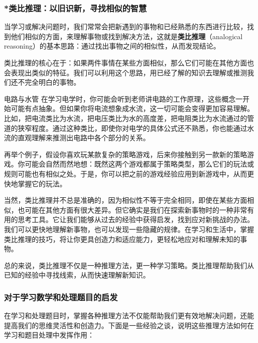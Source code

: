 \subsubsection{*类比推理：以旧识新，寻找相似的智慧}

当学习或解决问题时，我们常常会把新遇到的事物和已经熟悉的东西进行比较，找到他们相似的方面，来理解事物或找到解决方法，这就是\textbf{类比推理}（analogical reasoning）的基本思路：通过找出事物之间的相似性，从而发现结论。

类比推理的核心在于：如果两件事情在某些方面相似，那么它们可能在其他方面也会表现出类似的特征。我们可以利用这个思路，用已经了解的知识去理解或推测我们还不完全明白的事物。

\begin{example}{电路与水管}
在学习电学时，你可能会听到老师讲电路的工作原理，这些概念一开始可能有点抽象。但如果你将电流想象成水流，这一切可能会变得更加容易理解。比如，把电流类比为水流，把电压类比为水的高度差，把电阻类比为水流通过的管道的狭窄程度。通过这种类比，即使你对电学的具体公式还不熟悉，你也能通过水流的直观理解来推测出电路中各个部分的关系。
\end{example}

再举个例子，假设你喜欢玩某款复杂的策略游戏，后来你接触到另一款新的策略游戏。你可能会自然而然地想：既然这两个游戏都属于策略类型，那么它们的玩法或规则可能也有相似之处。于是，你可以把之前的游戏经验应用到新游戏中，从而更快地掌握它的玩法。

当然，类比推理并不总是准确的，因为相似性不等于完全相同，即使在某些方面相似，也可能在其他方面有很大差异。但它确实是我们在探索新事物时的一种非常有用的思考工具。它让我们能够从过去的经验中获得启发，找到应对新挑战的办法。我们可以更快地理解新事物，也可以发现一些隐藏的规律。在学习和生活中，掌握类比推理的技巧，将让你更具创造力和适应能力，更轻松地应对和理解未知的事物。

总的来说，类比推理不仅是一种推理方法，更一种学习策略。类比推理帮助我们从已知的经验中寻找线索，从而快速理解新知识。

\subsubsection{对于学习数学和处理题目的启发}

在学习和处理题目时，掌握各种推理方法不仅能帮助我们更有效地解决问题，还能提高我们的思维灵活性和创造力。下面是一些经验之谈，说明这些推理方法如何在学习和题目处理中发挥作用：

